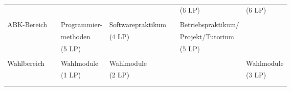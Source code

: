 \begin{center}
\begin{tabular}{||l||l|l|l|l|l|l||}
\hhline{||~||~|~|~|~|~|~||} &&&&&(6 LP)&(6 LP)\\
\hhline{||~||~|~|~|~|~|~||} &&&&&&\\
\hhline{|:=::======:|} ABK-Bereich&&Programmier-&Softwarepraktikum&&Betriebspraktikum/&\\
\hhline{||~||~|~|~|~|~|~||} &&methoden&(4 LP)&&Projekt/Tutorium&\\
\hhline{||~||~|~|~|~|~|~||} &&(5 LP)&&&(5 LP)&\\
\hhline{||~||~|~|~|~|~|~||} &&&&&&\\
\hhline{|:=::======:|} Wahlbereich&&Wahlmodule&Wahlmodule&&&Wahlmodule\\
\hhline{||~||~|~|~|~|~|~||} &&(1 LP)&(2 LP)&&&(3 LP)\\
\hhline{||~||~|~|~|~|~|~||} &&&&&&\\
\hhline{|b:=:b:======:b|}
\end{tabular}
\end{center}
\clearpage
